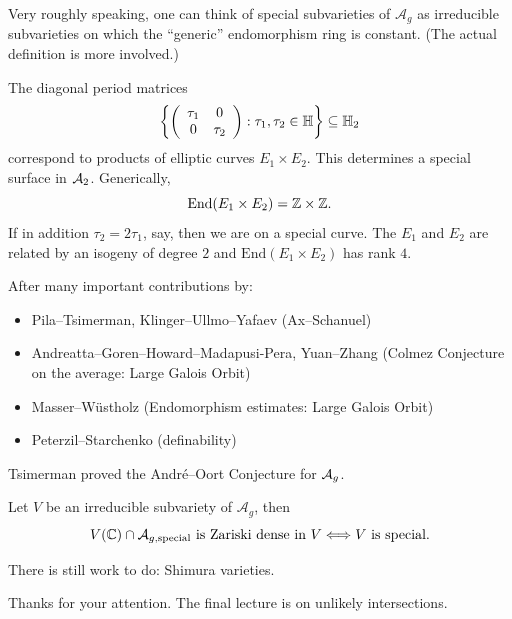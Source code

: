 \documentclass{beamer}
\begin{document}
\begin{frame}
  Very roughly speaking, one can think of special subvarieties of
  $\mathcal{A}_g$ as irreducible subvarieties on which the ``generic''
  endomorphism ring is constant. (The actual definition is more
  involved.)

  \begin{example}[Abelian surfaces, so $g=2$,  here $\dim \cA_2=3$]
    The diagonal period matrices
    \begin{equation*}
      \left\{\left( \begin{array}{cc} {\tau_1} & {0} \\ {0} & {\tau_2} \end{array} \right) : \tau_1,\tau_2\in{\mathbb{H}}
      \right\} \subseteq {\mathbb{H}}_2
    \end{equation*}
    correspond to products of elliptic curves $E_1\times E_2$. This
    determines 
    a \alert{special surface} in ${\mathcal A}_2$. Generically, 
    \begin{equation*}
      \mathrm{End}(E_1\times E_2) ={\mathbb{Z}}\times{\mathbb{Z}}. 
    \end{equation*}
    If in addition $\tau_2=2\tau_1$, say, then we are on a \alert{special curve}.
    The $E_1$ and $E_2$ are related by an isogeny of degree $2$
    and $\mathrm{End}(E_1\times E_2)$ has rank $4$. 
  \end{example}
\end{frame}

\begin{frame}
  After many important contributions by:

  \begin{itemize}
  \item  Pila--Tsimerman, Klinger--Ullmo--Yafaev (Ax--Schanuel)
  \item   Andreatta--Goren--Howard--Madapusi-Pera, Yuan--Zhang (Colmez
    Conjecture on the average: Large Galois Orbit)
  \item Masser--Wüstholz (Endomorphism estimates: Large Galois Orbit)
  \item   Peterzil--Starchenko (definability)    
  \end{itemize}

  Tsimerman proved the Andr\'e--Oort Conjecture for ${\mathcal A}_g$. 
  \begin{theorem}[Tsimerman]
    Let $V$ be an irreducible subvariety of $\mathcal{A}_g$, then
    \begin{equation*}
      V({\mathbb{C}})\cap \mathcal{A}_{g,\mathrm{special}} \text{ is Zariski
        dense in $V$}\Longleftrightarrow V\text{ is special.}
    \end{equation*}
  \end{theorem}

  There is still work to do: Shimura varieties.
\end{frame}



\begin{frame}
  \begin{center}
    Thanks for your attention. The final lecture is on unlikely
    intersections. 
  \end{center}
\end{frame}
\end{document}
